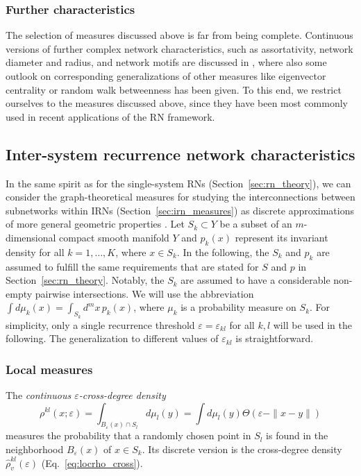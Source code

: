 \documentclass[graybox]{svmult}
\begin{document}
\subsubsection{Further characteristics}

The selection of measures discussed above is far from being complete. Continuous versions of further complex network characteristics, such as assortativity, network diameter and radius, and network motifs are discussed in \cite{Donges2012PRE}, where also some outlook on corresponding generalizations of other measures like eigenvector centrality or random walk betweenness has been given. To this end, we restrict ourselves to the measures discussed above, since they have been most commonly used in recent applications of the RN framework.


\subsection{Inter-system recurrence network characteristics}\label{sec:irn_theory}

In the same spirit as for the single-system RNs (Section~\ref{sec:rn_theory}), we can consider the graph-theoretical measures for studying the interconnections between subnetworks within IRNs (Section~\ref{sec:irn_measures}) as discrete approximations of more general geometric properties \cite{Donges2012PhD}. Let $S_k \subset Y$ be a subset of an $m$-dimensional compact smooth manifold $Y$ and $p_k(x)$ represent its invariant density for all $k=1,\dots,K$, where $x\in S_k$. In the following, the $S_k$ and $p_k$ are assumed to fulfill the same requirements that are stated for $S$ and $p$ in Section~\ref{sec:rn_theory}. Notably, the $S_k$ are assumed to have a considerable non-empty pairwise intersections. We will use the abbreviation $\int d\mu_k(x)=\int_{S_k} d^mx\,p_k(x)$, where $\mu_k$ is a probability measure on $S_k$. For simplicity, only a single recurrence threshold $\varepsilon=\varepsilon_{kl}$ for all $k,l$ will be used in the following. The generalization to different values of $\varepsilon_{kl}$ is straightforward.



\subsubsection{Local measures}

The \emph{continuous $\varepsilon$-cross-degree density}
\begin{equation}
\rho^{kl}(x;\varepsilon) = \int_{B_\varepsilon(x) \cap S_l} d\mu_l(y) = \int d\mu_l(y) \Theta(\varepsilon - \|x-y\|)
\end{equation}
\noindent
measures the probability that a randomly chosen point in $S_l$ is found in the neighborhood $B_\varepsilon(x)$ of $x\in S_k$. Its discrete version is the cross-degree density $\hat{\rho}_v^{kl}(\varepsilon)$ (Eq.~\ref{eq:locrho_cross}).
\end{document}
